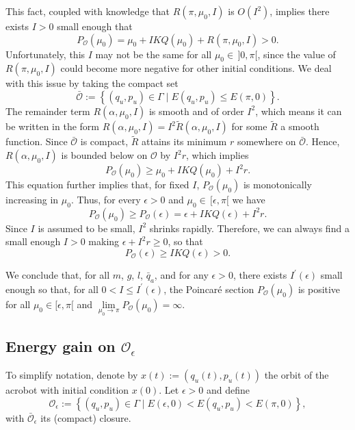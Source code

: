 This fact, coupled with knowledge that \(R(\pi,\mu_0,I)\) is \(O(I^2)\), 
implies there exists \(I > 0\) small enough that
\[
    P_\mathcal{O}(\mu_0) = \mu_0 + IKQ(\mu_0) + R(\pi,\mu_0,I) > 0
    .
\]
Unfortunately, this \(I\) may not be the
same for all \(\mu_0 \in \, ]0,\pi[\), since
the value of \(R(\pi,\mu_0,I)\) could become more negative
for other initial conditions.
We deal with this issue by taking the compact set
\[
    \bar{\mathcal{O}} := \left\{(q_u,p_u) \in \Gamma 
    \mid E(q_u,p_u) \leq E(\pi,0) \right\}
    .
\]
The remainder term \(R(\alpha,\mu_0,I)\) is smooth and of order \(I^2\),
which means it can be written in the form 
\(R(\alpha,\mu_0,I) = I^2\tilde{R}(\alpha,\mu_0,I)\)
for some \(\tilde{R}\) a smooth function.
Since \(\bar{\mathcal{O}}\) is compact, \(\tilde{R}\) attains its minimum
\({r}\) somewhere on \(\bar{\mathcal{O}}\).
Hence, \(R(\alpha,\mu_0,I)\) is bounded below on \(\mathcal{O}\) by
\(I^2{r}\), which implies 
\begin{equation}\label{eqn:acrobot-Po-lowerbound}
    P_\mathcal{O}(\mu_0) \geq \mu_0 + IKQ(\mu_0) + I^2{r}
    .
\end{equation}
This equation further implies that, for fixed \(I\),
\(P_\mathcal{O}(\mu_0)\) is monotonically increasing in \(\mu_0\).
Thus, for every \(\epsilon > 0\) and \(\mu_0 \in \, [\epsilon,\pi[\) we have
\[
    P_\mathcal{O}(\mu_0) \geq P_\mathcal{O}(\epsilon)
    = \epsilon + IKQ(\epsilon) + I^2{r}
    .
\]
Since \(I\) is assumed to be small, \(I^2\) shrinks rapidly.
Therefore, we can always find a small enough \(I > 0\) making 
\(\epsilon + I^2{r} \geq 0\), so that
\[
    P_\mathcal{O}(\epsilon) \geq IKQ(\epsilon) > 0
    .
\]

We conclude that, for all \(m\), \(g\), \(l\), \(\bar{q}_a\), and for
any \(\epsilon > 0\), there exists \(I^\prime(\epsilon)\) small enough so that,
for all \(0 < I \leq I^\prime(\epsilon)\),
the Poincar\'{e} section \(P_\mathcal{O}(\mu_0)\) is positive for all
\(\mu_0 \in [\epsilon,\pi[\) and 
\(\lim \limits_{\mu_0 \to \pi} P_\mathcal{O}(\mu_0) = \infty\).

\subsection*{Energy gain on \(\mathcal{O}_\epsilon\)}
To simplify notation, denote by \(x(t) := (q_u(t),p_u(t))\) the orbit of the
acrobot with initial condition \(x(0)\).
Let \(\epsilon > 0\) and define
\[
    \mathcal{O}_\epsilon := \left\{(q_u,p_u) \in \Gamma
    \mid E(\epsilon,0) < E(q_u,p_u) < E(\pi,0)\right\}
    ,
\]
with \(\bar{\mathcal{O}}_\epsilon\) its (compact) closure.

